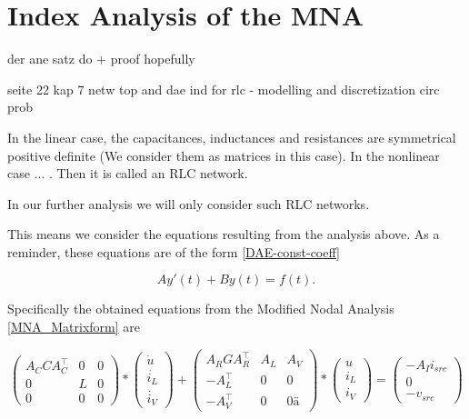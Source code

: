 \chapter{Index Analysis of the MNA}

der ane satz do + proof hopefully

seite 22 kap 7 netw top and dae ind for rlc - modelling and discretization circ prob

In the linear case, the capacitances, inductances and resistances are symmetrical positive definite (We consider them as matrices in this case). In the nonlinear case ... . Then it is called an RLC network.

In our further analysis we will only consider such RLC networks.

This means we consider the equations resulting from the analysis above. As a reminder, these equations are of the form \ref{DAE-const-coeff}

\begin{displaymath}
	A y'(t) + B y(t) = f(t).
\end{displaymath}

Specifically the obtained equations from the Modified Nodal Analysis \ref{MNA_Matrixform} are

\begin{displaymath}
	\begin{pmatrix}
		A_C C A_C^\top & 0 & 0 \\
		0 & L & 0 \\
		0 & 0 & 0
	\end{pmatrix}
	*
	\begin{pmatrix}
		\dot{u} \\
		\dot{i_L} \\
		\dot{i_V}
	\end{pmatrix}
	+
	\begin{pmatrix}
		A_R G A_R^\top & A_L & A_V \\
		-A_L^\top & 0 & 0 \\
		-A_V^\top & 0 & 0 ä
	\end{pmatrix}
	*
	\begin{pmatrix}
		u \\
		i_L \\
		i_V
	\end{pmatrix}
	=
	\begin{pmatrix}
		-A_I i_{src} \\
		0 \\
		-v_{src}
	\end{pmatrix}
\end{displaymath}

